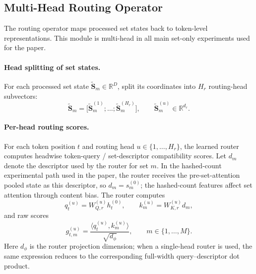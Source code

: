 \documentclass{article}
\theoremstyle{plain}
\theoremstyle{definition}
\theoremstyle{remark}
\begin{document}
\subsection{Multi-Head Routing Operator}
\label{sec:routing-operator}

The routing operator maps processed set states back to token-level representations. This module is multi-head in all main set-only experiments used for the paper.

\paragraph{Head splitting of set states.}
For each processed set state $\widetilde{\mathbf S}_m\in\mathbb R^D$, split its coordinates into $H_r$ routing-head subvectors:
\begin{equation}
\label{eq:head-split}
\widetilde{\mathbf S}_m=\bigl[\widetilde{\mathbf S}_m^{(1)};\dots;\widetilde{\mathbf S}_m^{(H_r)}\bigr],
\qquad
\widetilde{\mathbf S}_m^{(u)}\in\mathbb R^{d_r}.
\end{equation}

\paragraph{Per-head routing scores.}
For each token position $t$ and routing head $u\in\{1,\dots,H_r\}$, the learned router computes headwise token-query / set-descriptor compatibility scores. Let $d_m$ denote the descriptor used by the router for set $m$. In the hashed-count experimental path used in the paper, the router receives the pre-set-attention pooled state as this descriptor, so $d_m=s_m^{(0)}$; the hashed-count features affect set attention through content bias. The router computes
\begin{equation}
\label{eq:routing-query-key}
q_t^{(u)}=W_{Q,r}^{(u)}h_t^{(0)},
\qquad
k_m^{(u)}=W_{K,r}^{(u)}d_m,
\end{equation}
and raw scores
\begin{equation}
\label{eq:routing-scores}
g^{(u)}_{t,m}
=
\frac{\langle q_t^{(u)},k_m^{(u)}\rangle}{\sqrt{d_\phi}},
\qquad m\in\{1,\dots,M\}.
\end{equation}
Here $d_\phi$ is the router projection dimension; when a single-head router is used, the same expression reduces to the corresponding full-width query--descriptor dot product.
\end{document}
